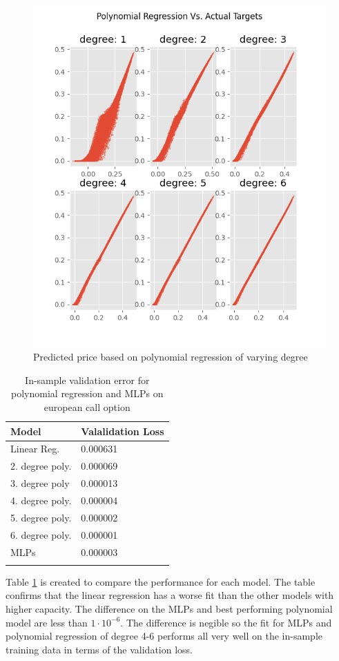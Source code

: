 \begin{figure}[H]
\centering
\includegraphics{Figures/polynomialEuroC.png}
\decoRule
\caption[Polynomial Regression Predictions Vs. Actual Prices]{Predicted price based on polynomial regression of varying degree}
\label{fig:PolynomialEuroC}
\end{figure}

\begin{table}[th]
\caption{In-sample validation error for polynomial regression and MLPs on european call option}
\label{tab:euroPerformance}
\centering
\begin{tabular}{l l}
\toprule
\textbf{Model} & \textbf{Valalidation Loss} \\
\midrule
Linear Reg. & 0.000631 \\
2. degree  poly.  & 0.000069 \\
3. degree poly & 0.000013\\
4. degree poly.  & 0.000004 \\
5. degree poly.  & 0.000002 \\
6. degree poly. & 0.000001\\
MLPs        & 0.000003\\
\bottomrule\\
\end{tabular}
\end{table}
Table \ref{tab:euroPerformance} is created to compare the performance for each model. The table confirms that the linear regression has a worse fit than the other models with higher capacity. The difference on the MLPs and best performing polynomial model are less than $1\cdot 10^{-6}$. The difference is negible so the fit for MLPs and polynomial regression of degree 4-6 performs all very well on the in-sample training data in terms of the validation loss.

